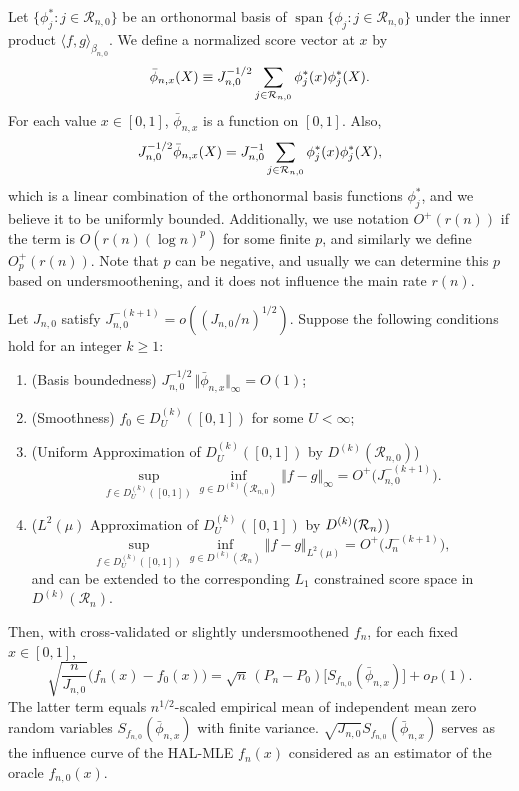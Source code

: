 Let \(\{\phi_j^*: j\in\mathcal R_{n,0}\}\) be an orthonormal basis of
\(\operatorname{span}\{\phi_j: j\in\mathcal R_{n,0}\}\) under the inner product
\(\langle f,g\rangle_{\beta_{n,0}}\). We define a normalized score vector at
\(x\) by
\[
\bar{\phi}_{n,x}(X)\equiv J_{n,0}^{-1/2}\sum_{j\in {\cal R}_{n,0}}\phi_j^*(x)\phi_j^*(X).
\]
For each value $x\in [0,1]$, $\bar{\phi}_{n,x}$ is a function on $[0,1]$.
Also,
\[
J_{n,0}^{-1/2}\bar{\phi}_{n,x}(X)
= J_{n,0}^{-1}\sum_{j\in {\cal R}_{n,0}}\phi_j^*(x)\phi_j^*(X),
\]
which is a linear combination of the orthonormal basis functions $\phi_j^*$,
and we believe it to be uniformly bounded. Additionally, we use notation
$O^+(r(n))$ if the term is $O(r(n)(\log n)^p)$ for some finite $p$, and
similarly we define $O_p^+(r(n))$. Note that $p$ can be negative, and usually
we can determine this $p$ based on undersmoothening, and it does not influence
the main rate $r(n)$.
\begin{theorem}
\label{thm:asymptotic-linearity-hal-mle}
Let $J_{n,0}$ satisfy $J_{n,0}^{-(k+1)}=o((J_{n,0}/n)^{1/2})$.
Suppose the following conditions hold for an integer $k \geq 1$:
\begin{enumerate}
  \item (Basis boundedness) $J_{n,0}^{-1/2}\,\Vert  \bar\phi_{n,x}\Vert_{\infty}=O(1)$;
  \item (Smoothness) $f_0\in D^{(k)}_U([0,1])$ for some $U<\infty$;
  \item (Uniform Approximation of $D^{(k)}_U([0,1])$ by $D^{(k)}(\mathcal R_{n,0})$) 
\[
\sup_{f\in D^{(k)}_U([0,1])}\inf_{g\in D^{(k)}(\mathcal R_{n,0})}\Vert f-g \Vert_{\infty}
=O^+\bigl(J_{n,0}^{-(k+1)}\bigr).
\]
  \item ($L^2(\mu)$ Approximation of $D^{(k)}_U([0,1])$ by $D^{(k)}({\cal R}_n)$)
\[
\sup_{f\in D^{(k)}_U([0,1])}\inf_{g\in D^{(k)}(\mathcal R_{n})}\Vert f-g \Vert_{L^2(\mu)}
=O^+\bigl(J_{n}^{-(k+1)}\bigr),
\]
and can be extended to the corresponding $L_1$ constrained score space in $D^{(k)}(\mathcal R_{n})$.

\end{enumerate}
Then, with cross‐validated or slightly undersmoothened $f_n$, for each fixed $x\in[0,1]$,
\[
  \sqrt{\frac{n}{J_{n,0}}}\bigl(f_n(x)-f_{{0}}(x)\bigr)
  =\sqrt{n}\,(P_n-P_0)\bigl[S_{f_{n,0}}(\bar\phi_{n,x})\bigr]
  +o_P(1).
\]
The latter term equals $n^{1/2}$-scaled empirical mean of independent mean zero random variables $S_{f_{n,0}}(\bar{\phi}_{n,x})$ with finite variance. $\sqrt{J_{n,0}}S_{f_{n,0}}(\bar\phi_{n,x})$ serves as the influence curve of the HAL-MLE $f_n(x)$ considered as an estimator of the oracle $f_{n,0}(x)$.
\end{theorem}

